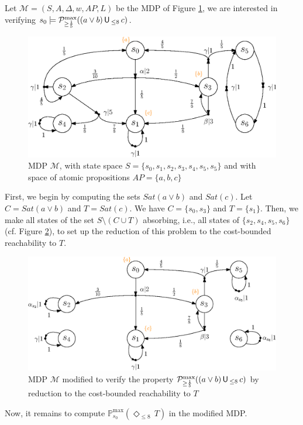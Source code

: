 \begin{example} \label{cost-bounded-example}
Let $\mathcal{M} = (S, A, \Delta, w, AP, L)$ be the MDP of Figure \ref{cost-bounded-until1}, we are interested in verifying $s_0 \models \mathcal{P}^{\max}_{\geq \frac{1}{5}}((a \vee b) \,\text{\sffamily U}\,_{\leq 8} \, c)$.
\begin{figure}[h]
  \centering
  \includegraphics[width=0.7\linewidth]{resources/MDPExample}
  \captionsetup{justification=centering}
  \caption{MDP $\mathcal{M}$, with state space $S=\{s_0, s_1, s_2, s_3, s_4, s_5, s_5\}$ and with space of atomic propositions $AP = \{a, b, c\}$}
  \label{cost-bounded-until1}
\end{figure}
First, we begin by computing the sets $Sat(a \vee b)$ and $Sat(c)$. Let $C = Sat(a \vee b)$ and $T = Sat(c)$. We have $C = \{s_0, s_3\}$ and $T = \{ s_1 \}$.
Then, we make all states of the set $S \setminus (C \cup T)$ absorbing, i.e., all states of $\{s_2, s_4, s_5, s_6\}$ (cf. Figure \ref{cost-bounded-until2}), to set up the reduction of this problem to the cost-bounded reachability to $T$.
\begin{figure}[h]
  \centering
  \includegraphics[width=0.7\linewidth]{resources/MDPExample2}
  \captionsetup{justification=centering}
  \caption{MDP $\mathcal{M}$ modified to verify the property $\mathcal{P}^{\max}_{\geq \frac{1}{5}}((a \vee b) \,\text{\sffamily U}\,_{\leq 8} \, c)$ by reduction to the cost-bounded reachability to $T$}
  \label{cost-bounded-until2}
\end{figure}
Now, it remains to compute $\mathbb{P}_{s_0}^{\max}(\Diamond_{\leq 8} \, T)$ in the modified MDP.

\end{example}
